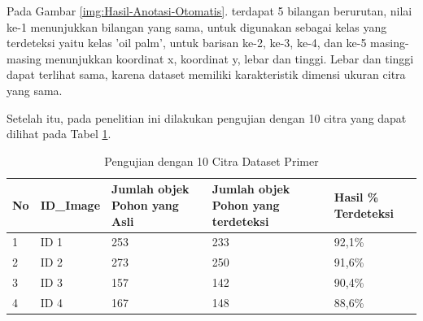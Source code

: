Pada Gambar \ref{img:Hasil-Anotasi-Otomatis}. terdapat 5 bilangan berurutan, nilai ke-1 menunjukkan bilangan yang sama, untuk digunakan sebagai kelas yang terdeteksi yaitu kelas 'oil palm', untuk barisan ke-2, ke-3, ke-4, dan ke-5 masing-masing menunjukkan koordinat x, koordinat y, lebar dan tinggi. Lebar dan tinggi dapat terlihat sama, karena dataset memiliki karakteristik dimensi ukuran citra yang sama.

Setelah itu, pada penelitian ini dilakukan pengujian dengan 10 citra yang dapat dilihat pada Tabel \ref{tbl:Pengujian-Dengan-10-Citra-Dataset-Primer}.

\begin{singlespace}
	\begin{table}[H]
		\centering
		\caption{Pengujian dengan 10 Citra Dataset Primer}
		\label{tbl:Pengujian-Dengan-10-Citra-Dataset-Primer}
		\begin{tabular}{|m{0.5cm}m{1cm}m{3cm}m{3cm}|m{3cm}|}
			\hline
		
			\multicolumn{1}{|m{0.5cm}|}{No} & \multicolumn{1}{m{2cm}|}{ID\_Image} & \multicolumn{1}{m{3cm}|}{Jumlah objek Pohon yang Asli} & Jumlah objek Pohon yang terdeteksi & Hasil \% Terdeteksi \\ \hline
			
			\multicolumn{1}{|m{0.5cm}|}{1}  & \multicolumn{1}{m{2cm}|}{ID 1}      & \multicolumn{1}{m{3cm}|}{253}                          & 233                                & 92,1\%              \\ \hline
			
			\multicolumn{1}{|m{0.5cm}|}{2}  & \multicolumn{1}{m{2cm}|}{ID 2}      & \multicolumn{1}{m{3cm}|}{273}                          & 250                                & 91,6\%              \\ \hline
			
			\multicolumn{1}{|m{0.5cm}|}{3}  & \multicolumn{1}{m{2cm}|}{ID 3}      & \multicolumn{1}{m{3cm}|}{157}                          & 142                                & 90,4\%              \\ \hline
			
			\multicolumn{1}{|m{0.5cm}|}{4}  & \multicolumn{1}{m{2cm}|}{ID 4}      & \multicolumn{1}{m{3cm}|}{167}                          & 148                                & 88,6\%              \\ \hline
			

\end{tabular}
\end{table}
\end{singlespace}
